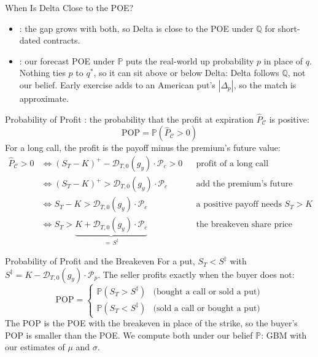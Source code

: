 \documentclass[aspectratio=169,11pt]{beamer}
\newcommand{\Q}{\mathbb{Q}}
\begin{document}
\begin{frame}{When Is Delta Close to the POE?}
  \begin{itemize}\setlength{\itemsep}{0.6em}
    \item {}: the gap grows with both,
      so Delta is close to the POE under $\Q$ for short-dated contracts.
    \item {}: our forecast POE under
      $\mathbb{P}$ puts the real-world up probability $p$ in place of $q$. Nothing
      ties $p$ to $q^{*}$, so it can sit above or below Delta: Delta follows
      $\Q$, not our belief. Early exercise adds to an American put's $|\Delta_{p}|$, so the
      match is approximate.
  \end{itemize}
\end{frame}

\begin{frame}{Probability of Profit}
  \vspace{0.3em}
  : the probability that the profit at
  expiration $\hat{P}_{\mathcal{C}}$ is positive:
  \begin{equation*}
    \boxed{\text{POP}=\mathbb{P}\left(\hat{P}_{\mathcal{C}} > 0\right)}
  \end{equation*}
  For a long call, the profit is the payoff minus the premium's future value:
  \begin{align*}
    \hat{P}_{\mathcal{C}} > 0 & \iff \left(S_{T}-K\right)^{+} - \mathcal{D}_{T,0}(g_{y})\cdot\mathcal{P}_{c} > 0 && \text{profit of a long call}\\
    & \iff \left(S_{T}-K\right)^{+} > \mathcal{D}_{T,0}(g_{y})\cdot\mathcal{P}_{c} && \text{add the premium's future value}\\
    & \iff S_{T}-K > \mathcal{D}_{T,0}(g_{y})\cdot\mathcal{P}_{c} && \text{a positive payoff needs } S_{T}>K\\
    & \iff S_{T} > \underbrace{K + \mathcal{D}_{T,0}(g_{y})\cdot\mathcal{P}_{c}}_{=\,S^{\ddagger}} && \text{the breakeven share price}
  \end{align*}
\end{frame}

\begin{frame}{Probability of Profit and the Breakeven}
  For a put, $S_{T}<S^{\ddagger}$ with
  $S^{\ddagger}=K-\mathcal{D}_{T,0}(g_{y})\cdot\mathcal{P}_{p}$. The seller
  profits exactly when the buyer does not:
  \begin{equation*}
    \boxed{
    \text{POP} = \begin{cases}
    \mathbb{P}\left(S_{T} > S^{\ddagger}\right) & \text{(bought a call or sold a put)} \\
    \mathbb{P}\left(S_{T} < S^{\ddagger}\right) & \text{(sold a call or bought a put)}
    \end{cases}}
  \end{equation*}
  The POP is the POE with the breakeven in place of the strike, so the buyer's
  POP is smaller than the POE. We compute both under our belief $\mathbb{P}$:
  GBM with our estimates of $\mu$ and $\sigma$.
\end{frame}
\end{document}
